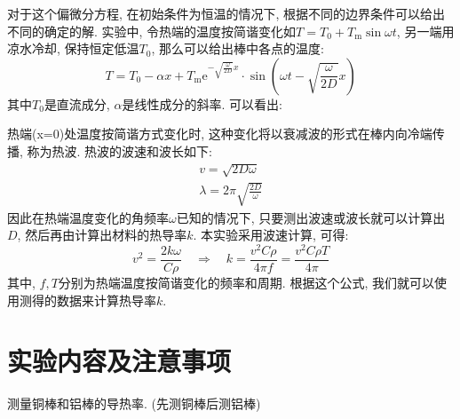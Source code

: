 \documentclass[11pt]{article}
\begin{document}
对于这个偏微分方程, 在初始条件为恒温的情况下, 根据不同的边界条件可以给出不同的确定的解. 实验中, 令热端的温度按简谐变化如$T = T_0 + T_{\mathrm{m}}\sin\omega t$, 另一端用凉水冷却, 保持恒定低温$T_0$, 那么可以给出棒中各点的温度:
\[
T = T_0 - \alpha x + T_{\mathrm{m}} \mathrm{e}^{-\sqrt{\frac{\omega}{2D}}x} \cdot \sin \left( \omega t - \sqrt{\frac{\omega}{2D}}x \right)
\]
其中$T_0$是直流成分, $\alpha$是线性成分的斜率. 可以看出:

热端(x=0)处温度按简谐方式变化时, 这种变化将以衰减波的形式在棒内向冷端传播, 称为热波. 热波的波速和波长如下:
\begin{gather*}
	v = \sqrt{2D\omega}\\
	\lambda = 2\pi\sqrt{\frac{2D}{\omega}}
\end{gather*}
因此在热端温度变化的角频率$\omega$已知的情况下, 只要测出波速或波长就可以计算出$D$, 然后再由计算出材料的热导率$k$. 本实验采用波速计算, 可得:
\[
v^2 = \frac{2k\omega}{C\rho} \quad\Longrightarrow\quad k = \frac{v^2C\rho}{4\pi f} = \frac{v^2C\rho T}{4\pi}
\]
其中, $f,T$分别为热端温度按简谐变化的频率和周期. 根据这个公式, 我们就可以使用测得的数据来计算热导率$k$.

\section{实验内容及注意事项}

测量铜棒和铝棒的导热率. (先测铜棒后测铝棒) 
\end{document}

